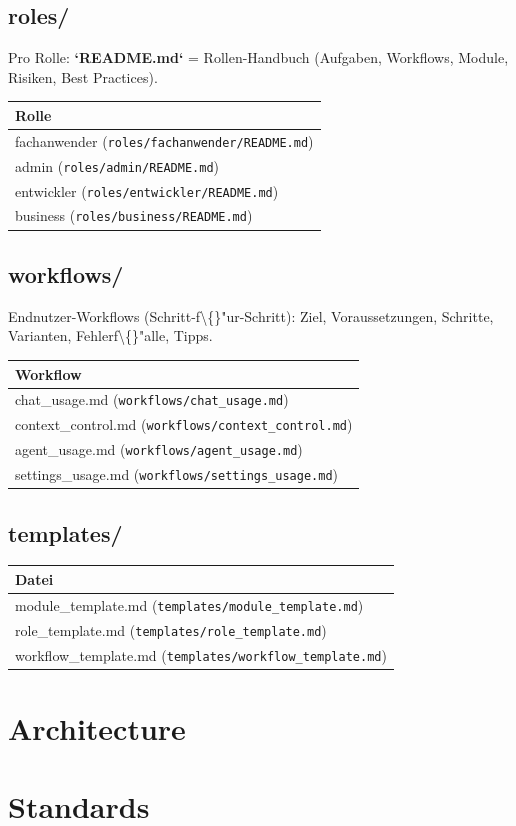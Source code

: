 \subsection{roles/}

Pro Rolle: \textbf{`README.md`} = Rollen-Handbuch (Aufgaben, Workflows, Module, Risiken, Best Practices).

\begin{center}
\begin{tabular}{l}
\hline
Rolle \\
\hline
fachanwender (\texttt{roles/fachanwender/README.md}) \\
admin (\texttt{roles/admin/README.md}) \\
entwickler (\texttt{roles/entwickler/README.md}) \\
business (\texttt{roles/business/README.md}) \\
\hline
\end{tabular}
\end{center}

\subsection{workflows/}

Endnutzer-Workflows (Schritt-f\textbackslash\{\}"ur-Schritt): Ziel, Voraussetzungen, Schritte, Varianten, Fehlerf\textbackslash\{\}"alle, Tipps.

\begin{center}
\begin{tabular}{l}
\hline
Workflow \\
\hline
chat\_usage.md (\texttt{workflows/chat\_usage.md}) \\
context\_control.md (\texttt{workflows/context\_control.md}) \\
agent\_usage.md (\texttt{workflows/agent\_usage.md}) \\
settings\_usage.md (\texttt{workflows/settings\_usage.md}) \\
\hline
\end{tabular}
\end{center}

\subsection{templates/}

\begin{center}
\begin{tabular}{l}
\hline
Datei \\
\hline
module\_template.md (\texttt{templates/module\_template.md}) \\
role\_template.md (\texttt{templates/role\_template.md}) \\
workflow\_template.md (\texttt{templates/workflow\_template.md}) \\
\hline
\end{tabular}
\end{center}

\section{Architecture}

\section{Standards}
